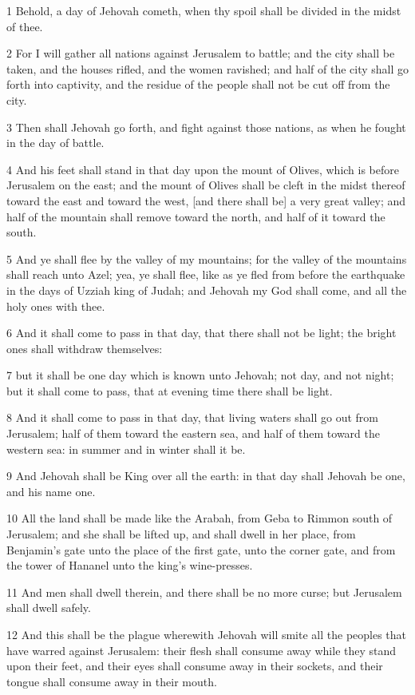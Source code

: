 \par 1 Behold, a day of Jehovah cometh, when thy spoil shall be divided in the midst of thee.
\par 2 For I will gather all nations against Jerusalem to battle; and the city shall be taken, and the houses rifled, and the women ravished; and half of the city shall go forth into captivity, and the residue of the people shall not be cut off from the city.
\par 3 Then shall Jehovah go forth, and fight against those nations, as when he fought in the day of battle.
\par 4 And his feet shall stand in that day upon the mount of Olives, which is before Jerusalem on the east; and the mount of Olives shall be cleft in the midst thereof toward the east and toward the west, [and there shall be] a very great valley; and half of the mountain shall remove toward the north, and half of it toward the south.
\par 5 And ye shall flee by the valley of my mountains; for the valley of the mountains shall reach unto Azel; yea, ye shall flee, like as ye fled from before the earthquake in the days of Uzziah king of Judah; and Jehovah my God shall come, and all the holy ones with thee.
\par 6 And it shall come to pass in that day, that there shall not be light; the bright ones shall withdraw themselves:
\par 7 but it shall be one day which is known unto Jehovah; not day, and not night; but it shall come to pass, that at evening time there shall be light.
\par 8 And it shall come to pass in that day, that living waters shall go out from Jerusalem; half of them toward the eastern sea, and half of them toward the western sea: in summer and in winter shall it be.
\par 9 And Jehovah shall be King over all the earth: in that day shall Jehovah be one, and his name one.
\par 10 All the land shall be made like the Arabah, from Geba to Rimmon south of Jerusalem; and she shall be lifted up, and shall dwell in her place, from Benjamin's gate unto the place of the first gate, unto the corner gate, and from the tower of Hananel unto the king's wine-presses.
\par 11 And men shall dwell therein, and there shall be no more curse; but Jerusalem shall dwell safely.
\par 12 And this shall be the plague wherewith Jehovah will smite all the peoples that have warred against Jerusalem: their flesh shall consume away while they stand upon their feet, and their eyes shall consume away in their sockets, and their tongue shall consume away in their mouth.
